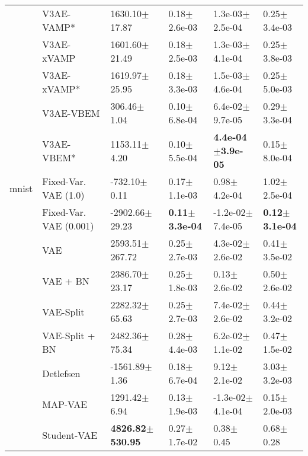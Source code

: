 \begin{tabular}{llllll}
      & V3AE-VAMP* &            1630.10$\pm$17.87 &              0.18$\pm$2.6e-03 &           1.3e-03$\pm$2.5e-04 &              0.25$\pm$3.4e-03 \\
      & V3AE-xVAMP &            1601.60$\pm$21.49 &              0.18$\pm$2.5e-03 &           1.3e-03$\pm$4.1e-04 &              0.25$\pm$3.8e-03 \\
      & V3AE-xVAMP* &            1619.97$\pm$25.95 &              0.18$\pm$3.3e-03 &           1.5e-03$\pm$4.6e-04 &              0.25$\pm$5.0e-03 \\
      & V3AE-VBEM &              306.46$\pm$1.04 &              0.10$\pm$6.8e-04 &           6.4e-02$\pm$9.7e-05 &              0.29$\pm$3.3e-04 \\
      & V3AE-VBEM* &             1153.11$\pm$4.20 &              0.10$\pm$5.5e-04 &  \textbf{4.4e-04$\pm$3.9e-05} &              0.15$\pm$8.0e-04 \\
mnist & Fixed-Var. VAE (1.0) &             -732.10$\pm$0.11 &              0.17$\pm$1.1e-03 &              0.98$\pm$4.2e-04 &              1.02$\pm$2.5e-04 \\
      & Fixed-Var. VAE (0.001) &           -2902.66$\pm$29.23 &     \textbf{0.11$\pm$3.3e-04} &          -1.2e-02$\pm$7.4e-05 &     \textbf{0.12$\pm$3.1e-04} \\
      & VAE &           2593.51$\pm$267.72 &              0.25$\pm$2.7e-03 &           4.3e-02$\pm$2.6e-02 &              0.41$\pm$3.5e-02 \\
      & VAE + BN &            2386.70$\pm$23.17 &              0.25$\pm$1.8e-03 &              0.13$\pm$2.6e-02 &              0.50$\pm$2.6e-02 \\
      & VAE-Split &            2282.32$\pm$65.63 &              0.25$\pm$2.7e-03 &           7.4e-02$\pm$2.6e-02 &              0.44$\pm$3.2e-02 \\
      & VAE-Split + BN &            2482.36$\pm$75.34 &              0.28$\pm$4.4e-03 &           6.2e-02$\pm$1.1e-02 &              0.47$\pm$1.5e-02 \\
      & Detlefsen &            -1561.89$\pm$1.36 &              0.18$\pm$6.7e-04 &              9.12$\pm$2.1e-02 &              3.03$\pm$3.2e-03 \\
      & MAP-VAE &             1291.42$\pm$6.94 &              0.13$\pm$1.9e-03 &          -1.3e-02$\pm$4.1e-04 &              0.15$\pm$2.0e-03 \\
      & Student-VAE &  \textbf{4826.82$\pm$530.95} &              0.27$\pm$1.7e-02 &                 0.38$\pm$0.45 &                 0.68$\pm$0.28 \\

\end{tabular}
